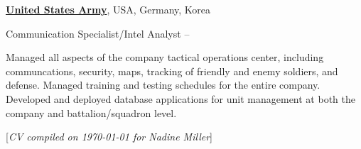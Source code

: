 \documentclass[letterpaper,10pt,oneside]{article}
\newcommand{\CVNote}{CV compiled on {\today} for Nadine Miller}
\begin{document}
\begin{body}
\begin{detail}
\end{detail}
\EntryGap


\href{http://www.goarmy.com/}
{\textbf{United States Army}},
USA, Germany, Korea
\par
Communication Specialist/Intel Analyst
\hfill
{} -- 

\begin{detail}
\BulletItem
Managed all aspects of the company tactical operations center, including communcations, security, maps, tracking of friendly and enemy soldiers, and defense.
\BulletItem
Managed training and testing schedules for the entire company.
\BulletItem
Developed and deployed database applications for unit management at both the company and battalion/squadron level.

\end{detail}
\EntryGap

\end{body}


\begin{flushright}
\scriptsize%
[\textit{\CVNote}]%
\hspace{2.0mm}\null
\end{flushright}

\label{LastPage}~
\end{document}
